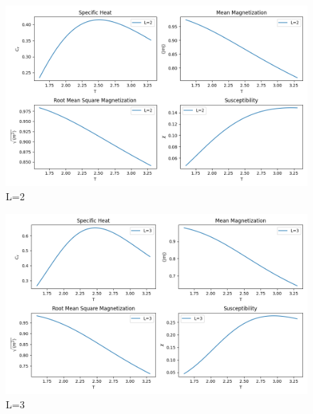 \documentclass[11pt]{article}
\begin{document}
\begin{question}
  \begin{figure}[H]
    \centering
    \includegraphics[width=0.7\columnwidth]{2.png}
    \caption{L=2}
  \end{figure}
  \begin{figure}[H]
    \centering
    \includegraphics[width=0.7\columnwidth]{3.png}
    \caption{L=3}
  \end{figure}
  

\end{question}
\end{document}
